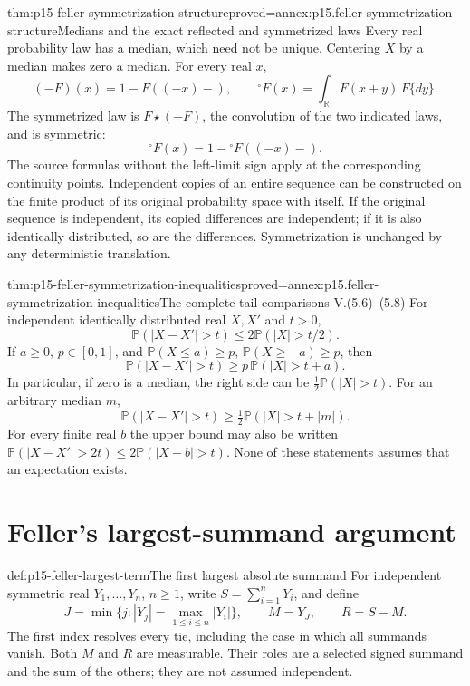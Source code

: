 \begin{hbtheorem}{thm:p15-feller-symmetrization-structure}{proved=annex:p15.feller-symmetrization-structure}{Medians and the exact reflected and symmetrized laws}
Every real probability law has a median, which need not be unique.
Centering \(X\) by a median makes zero a median.
For every real \(x\),
\[
 (-F)(x)=1-F((-x)-),\qquad
 {}^{\circ}F(x)=\int_{\mathbb R}F(x+y)\,F\{dy\}.
\]
The symmetrized law is \(F\star(-F)\), the convolution of the
two indicated laws, and is symmetric:
\[
 {}^{\circ}F(x)=1-{}^{\circ}F((-x)-).
\]
The source formulas without the left-limit sign apply at the
corresponding continuity points.
Independent copies of an entire sequence can be constructed on the
finite product of its original probability space with itself. If the
original sequence is independent, its copied differences are independent;
if it is also identically distributed, so are the differences.
Symmetrization is unchanged by any deterministic translation.
\end{hbtheorem}

\begin{hbtheorem}{thm:p15-feller-symmetrization-inequalities}{proved=annex:p15.feller-symmetrization-inequalities}{The complete tail comparisons V.(5.6)--(5.8)}
For independent identically distributed real \(X,X'\) and \(t>0\),
\[
 \mathbb P(|X-X'|>t)\leq2\mathbb P(|X|>t/2).
\]
If \(a\geq0\), \(p\in[0,1]\), and
\(\mathbb P(X\leq a)\geq p\),
\(\mathbb P(X\geq-a)\geq p\), then
\[
 \mathbb P(|X-X'|>t)\geq p\,\mathbb P(|X|>t+a).
\]
In particular, if zero is a median, the right side can be
\(\tfrac12\mathbb P(|X|>t)\).
For an arbitrary median \(m\),
\[
 \mathbb P(|X-X'|>t)
           \geq\tfrac12\mathbb P(|X|>t+|m|).
\]
For every finite real \(b\) the upper bound may also be written
\(\mathbb P(|X-X'|>2t)\leq2\mathbb P(|X-b|>t)\).
None of these statements assumes that an expectation exists.
\end{hbtheorem}

\section{Feller's largest-summand argument}
\label{sec:p15-feller-largest-summand}

\begin{hbdefinition}{def:p15-feller-largest-term}{The first largest absolute summand}
For independent symmetric real \(Y_1,\ldots,Y_n\), \(n\geq1\),
write \(S=\sum_{i=1}^nY_i\), and define
\[
 J=\min\{j:|Y_j|=\max_{1\leq i\leq n}|Y_i|\},\qquad
 M=Y_J,\qquad R=S-M.
\]
The first index resolves every tie, including the case in which all
summands vanish. Both \(M\) and \(R\) are measurable. Their roles
are a selected signed summand and the sum of the others; they are
not assumed independent.
\end{hbdefinition}

